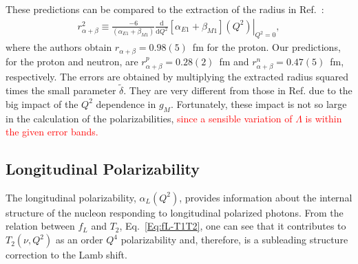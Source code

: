 \documentclass[twocolumn,prc,showpacs,nofootinbib,preprintnumbers,amsmath,amssymb,superscriptaddress]{revtex4-1}
\def\dd{\mathrm{d}}
\begin{document}
These predictions can be compared to the extraction of the radius in Ref.~\cite{Hall:2014lea}: 
\begin{align}\label{Eq:r2alphabetaDef}
r_{\alpha+\beta}^2\equiv \frac{-6}{(\alpha_{E1}+\beta_{M1})}\left.\frac{\dd}{\dd Q^2}[\alpha_{E1}+\beta_{M1}](Q^2)\right|_{Q^2=0},
\end{align}
where the authors obtain $r_{\alpha+\beta}=0.98(5)$~fm for the proton. 
Our predictions, for the proton and neutron,  are $r^p_{\alpha+\beta}= 0.28(2)$~fm and $r^n_{\alpha+\beta}=0.47(5)$~fm, respectively. 
The errors are obtained by multiplying the extracted radius squared times the small parameter $\tilde{\delta}$. 
They are very different from those in Ref.\cite{Hall:2014lea} due to the big impact of the $Q^2$ dependence in $g_M$.
Fortunately, these impact is not so large in the calculation of the polarizabilities, \textcolor{red}{since a sensible variation of $\Lambda$ is within the given error bands.}


\subsection{Longitudinal Polarizability}

The longitudinal polarizability, $\alpha_L(Q^2)$, provides information about the internal structure of the nucleon responding to longitudinal polarized photons.
From the relation between $f_L$ and $T_2$, Eq.~\eqref{Eq:fL-T1T2}, one can see that it contributes to $T_2(\nu,Q^2)$ as an order $Q^4$ polarizability and, therefore, is a  subleading structure correction to the Lamb shift.
\end{document}
